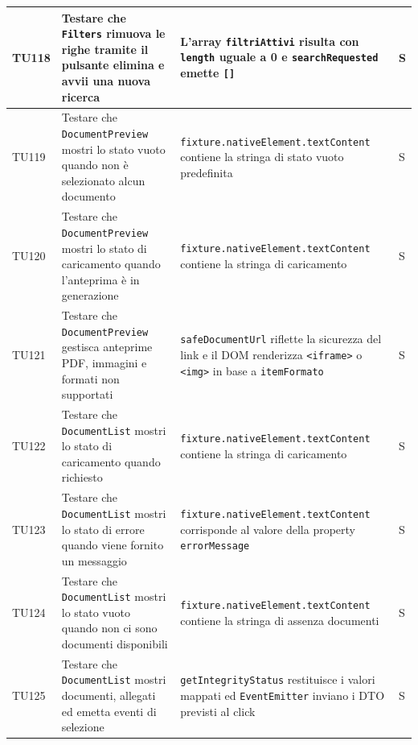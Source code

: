 \documentclass[a4paper,12pt]{article}
\begin{document}
\begin{longtable}{|M{1.2cm}|M{5cm}|M{7cm}|M{1.5cm}|}
            TU118 & Testare che \texttt{Filters} rimuova le righe tramite il pulsante elimina e avvii una nuova ricerca & L'array \texttt{filtriAttivi} risulta con \texttt{length} uguale a 0 e \texttt{searchRequested} emette \texttt{[]} & S \\ 
            \hline
            
            TU119 & Testare che \texttt{DocumentPreview} mostri lo stato vuoto quando non è selezionato alcun documento & \texttt{fixture.nativeElement.textContent} contiene la stringa di stato vuoto predefinita & S \\ 
            \hline
            
            TU120 & Testare che \texttt{DocumentPreview} mostri lo stato di caricamento quando l'anteprima è in generazione & \texttt{fixture.nativeElement.textContent} contiene la stringa di caricamento & S \\ 
            \hline
            
            TU121 & Testare che \texttt{DocumentPreview} gestisca anteprime PDF, immagini e formati non supportati & \texttt{safeDocumentUrl} riflette la sicurezza del link e il DOM renderizza \texttt{<iframe>} o \texttt{<img>} in base a \texttt{itemFormato} & S \\ 
            \hline

            TU122 & Testare che \texttt{DocumentList} mostri lo stato di caricamento quando richiesto & \texttt{fixture.nativeElement.textContent} contiene la stringa di caricamento & S \\ 
            \hline
            
            TU123 & Testare che \texttt{DocumentList} mostri lo stato di errore quando viene fornito un messaggio & \texttt{fixture.nativeElement.textContent} corrisponde al valore della property \texttt{errorMessage} & S \\ 
            \hline
            
            TU124 & Testare che \texttt{DocumentList} mostri lo stato vuoto quando non ci sono documenti disponibili & \texttt{fixture.nativeElement.textContent} contiene la stringa di assenza documenti & S \\ 
            \hline
            
            TU125 & Testare che \texttt{DocumentList} mostri documenti, allegati ed emetta eventi di selezione & \texttt{getIntegrityStatus} restituisce i valori mappati ed \texttt{EventEmitter} inviano i DTO previsti al click & S \\ 
            \hline
            

\end{longtable}
\end{document}

